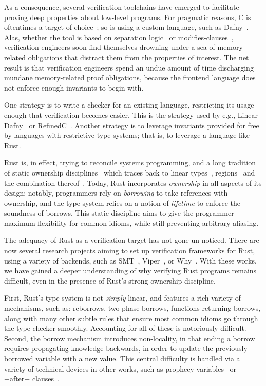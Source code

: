 \documentclass[acmsmall,screen]{acmart}
\begin{document}
As a consequence, several verification toolchains have emerged to facilitate
proving deep
properties about low-level programs. For pragmatic reasons, C is oftentimes a target of
choice~\cite{protzenko2017verified,cao2018vst}; so is using
a custom language, such as Dafny~\cite{hawblitzel2014ironclad}. Alas,
whether the tool is based on separation logic~\cite{reynolds2002separation} or
modifies-clauses~\cite{leino2010dafny}, verification
engineers soon find themselves drowning under a sea of memory-related
obligations that distract them from the properties of interest.
The net result is that verification engineers spend an undue amount of time
discharging mundane memory-related proof obligations, because the frontend language does not
enforce enough invariants to begin with.

One strategy is to write a checker for an existing language, restricting its usage
enough that verification becomes easier. This is the strategy used by e.g.,
Linear Dafny~\cite{lineardafny}
or RefinedC~\cite{sammler2021refinedc}.
Another strategy is to leverage invariants provided for free by languages with
restrictive type systems; that is, to leverage a language like Rust.

Rust is, in effect, trying to reconcile systems programming, and a long
tradition of static ownership disciplines~\cite{boyland2001capabilities,clarke1998ownership} which
traces back to linear types~\cite{wadler1990linear},
regions~\cite{tofte1997region} and the combination
thereof~\cite{fluet2006linear}. Today, Rust incorporates \emph{ownership} in all
aspects of its design; notably, programmers rely on \emph{borrowing} to take
references with ownership, and the type system relies on a notion of
\emph{lifetime} to enforce the soundness of borrows.  This static discipline aims
to give the programmer maximum flexibility for common idioms, while still
preventing arbitrary aliasing.

The adequacy of Rust as a verification target
 has not gone un-noticed. There
are now several research projects aiming to set up verification frameworks for
Rust, using a variety of backends, such as
SMT~\cite{matsushita2020rusthorn,verus},
Viper~\cite{prusti,prusti21}, or Why~\cite{creusot}.
With these works, we have gained a deeper understanding of why
verifying Rust programs remains difficult, even in the presence of Rust's strong ownership
discipline.

First, Rust's type system is not \emph{simply} linear, and features a rich
variety of mechanisms, such as: reborrows, two-phase borrows, functions returning borrows, along with many
other subtle rules that ensure most common idioms go through the type-checker
smoothly. Accounting for all of these is notoriously difficult. Second, the
borrow mechanism introduces non-locality, in that ending a borrow requires
propagating knowledge backwards, in order to update the previously-borrowed
variable with a new value. This central difficulty is
handled via a variety of technical devices in other works, such as prophecy
variables~\cite{matsushita2020rusthorn} or \li+after+ clauses~\cite{verus}.
\end{document}
